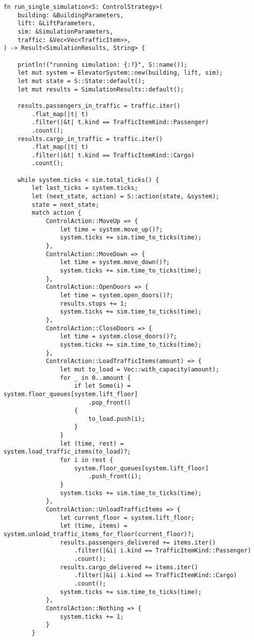 \begin{lstlisting}[caption={Implementation of a single simulation run}, label={lst:app:simsinglerun}]
fn run_single_simulation<S: ControlStrategy>(
    building: &BuildingParameters,
    lift: &LiftParameters,
    sim: &SimulationParameters,
    traffic: &Vec<Vec<TrafficItem>>,
) -> Result<SimulationResults, String> {

    println!("running simulation: {:?}", S::name());
    let mut system = ElevatorSystem::new(building, lift, sim);
    let mut state = S::State::default();
    let mut results = SimulationResults::default();

    results.passengers_in_traffic = traffic.iter()
        .flat_map(|t| t)
        .filter(|&t| t.kind == TrafficItemKind::Passenger)
        .count();
    results.cargo_in_traffic = traffic.iter()
        .flat_map(|t| t)
        .filter(|&t| t.kind == TrafficItemKind::Cargo)
        .count();

    while system.ticks < sim.total_ticks() {
        let last_ticks = system.ticks;
        let (next_state, action) = S::action(state, &system);
        state = next_state;
        match action {
            ControlAction::MoveUp => {
                let time = system.move_up()?;
                system.ticks += sim.time_to_ticks(time);
            },
            ControlAction::MoveDown => {
                let time = system.move_down()?;
                system.ticks += sim.time_to_ticks(time);
            },
            ControlAction::OpenDoors => {
                let time = system.open_doors()?;
                results.stops += 1;
                system.ticks += sim.time_to_ticks(time);
            },
            ControlAction::CloseDoors => {
                let time = system.close_doors()?;
                system.ticks += sim.time_to_ticks(time);
            },
            ControlAction::LoadTrafficItems(amount) => {
                let mut to_load = Vec::with_capacity(amount);
                for _ in 0..amount {
                    if let Some(i) = system.floor_queues[system.lift_floor]
                        .pop_front()
                    {
                        to_load.push(i);
                    }
                }
                let (time, rest) = system.load_traffic_items(to_load)?;
                for i in rest {
                    system.floor_queues[system.lift_floor]
                        .push_front(i);
                }
                system.ticks += sim.time_to_ticks(time);
            },
            ControlAction::UnloadTrafficItems => {
                let current_floor = system.lift_floor;
                let (time, items) = system.unload_traffic_items_for_floor(current_floor)?;
                results.passengers_delivered += items.iter()
                    .filter(|&i| i.kind == TrafficItemKind::Passenger)
                    .count();
                results.cargo_delivered += items.iter()
                    .filter(|&i| i.kind == TrafficItemKind::Cargo)
                    .count();
                system.ticks += sim.time_to_ticks(time);
            },
            ControlAction::Nothing => {
                system.ticks += 1;
            }
        }


\end{lstlisting}
